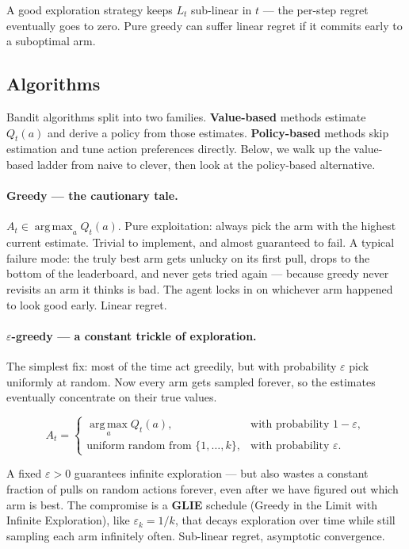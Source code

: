 \documentclass[11pt, oneside]{book}
\newcommand{\argmax}{\operatorname*{arg\,max}}
\begin{document}
A good exploration strategy keeps $L_t$ sub-linear in $t$ --- the per-step regret
eventually goes to zero.
Pure greedy can suffer linear regret if it commits early to a suboptimal arm.

\subsection{Algorithms}

Bandit algorithms split into two families. \textbf{Value-based} methods estimate
$Q_t(a)$ and derive a policy from those estimates. \textbf{Policy-based} methods skip
estimation and tune action preferences directly. Below, we walk up the value-based
ladder from naive to clever, then look at the policy-based alternative.

\paragraph{Greedy --- the cautionary tale.}
$A_t \in \argmax_a Q_t(a)$. Pure exploitation: always pick the arm with the highest
current estimate. Trivial to implement, and almost guaranteed to fail.
A typical failure mode: the truly best arm gets unlucky on its first pull, drops to
the bottom of the leaderboard, and never gets tried again --- because greedy never
revisits an arm it thinks is bad. The agent locks in on whichever arm happened to
look good early. Linear regret.

\paragraph{$\varepsilon$-greedy --- a constant trickle of exploration.}
The simplest fix: most of the time act greedily, but with probability $\varepsilon$
pick uniformly at random. Now every arm gets sampled forever, so the estimates
eventually concentrate on their true values.

\begin{defbox}[title={$\varepsilon$-Greedy Action Selection}]
\[
  A_t = \begin{cases}
    \argmax_a Q_t(a), & \text{with probability } 1 - \varepsilon, \\
    \text{uniform random from } \{1, \dots, k\}, & \text{with probability } \varepsilon.
  \end{cases}
\]
\end{defbox}

A fixed $\varepsilon > 0$ guarantees infinite exploration --- but also wastes a constant
fraction of pulls on random actions forever, even after we have figured out which arm
is best. The compromise is a \textbf{GLIE} schedule (Greedy in the Limit with Infinite
Exploration), like $\varepsilon_k = 1/k$, that decays exploration over time while still
sampling each arm infinitely often. Sub-linear regret, asymptotic convergence.
\end{document}
